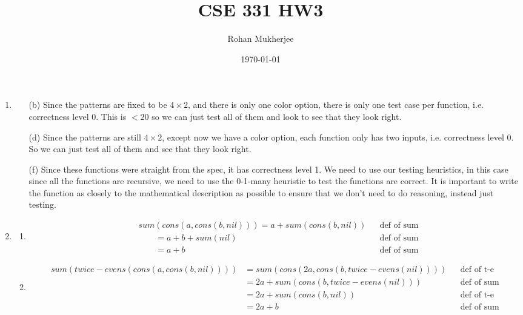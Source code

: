 \documentclass[12pt]{article}
\title{CSE 331 HW3}
\date{\today}
\author{Rohan Mukherjee}
\theoremstyle{definitionstyle}
\begin{document}
    \maketitle
    \begin{enumerate}[leftmargin=\labelsep]
        \item \begin{enumerate}
            \item[(b)] Since the patterns are fixed to be $4 \times 2$, and there is only one color option, there is only one test case per function, i.e. correctness level 0. This is $<20$ so we can just test all of them and look to see that they look right.
            \item[(d)] Since the patterns are still $4 \times 2$, except now we have a color option, each function only has two inputs, i.e. correctness level 0. So we can just test all of them and see that they look right.
            \item[(f)] Since these functions were straight from the spec, it has correctness level 1. We need to use our testing heuristics, in this case since all the functions are recursive, we need to use the 0-1-many heuristic to test the functions are correct. It is important to write the function as closely to the mathematical description as possible to ensure that we don't need to do reasoning, instead just testing.
        \end{enumerate}
        \item \begin{enumerate}[label=(\alph*)]
            \item $$\begin{aligned}
                &sum(cons(a, cons(b, nil))) = a + sum(cons(b, nil)) && \text{def of sum} \\
                &\qquad = a + b + sum(nil) && \text{def of sum} \\
                &\qquad = a + b && \text{def of sum}
            \end{aligned}$$
            \item $$\begin{aligned}
                sum(twice-evens(cons(a, cons(b, nil)))) &= sum(cons(2a, cons(b, twice-evens(nil)))) && \text{def of t-e} \\
                &= 2a + sum(cons(b, twice-evens(nil))) && \text{def of sum} \\
                &= 2a + sum(cons(b, nil)) && \text{def of t-e} \\
                &= 2a + b && \text{def of sum}

\end{aligned}$$
\end{enumerate}
\end{enumerate}
\end{document}
